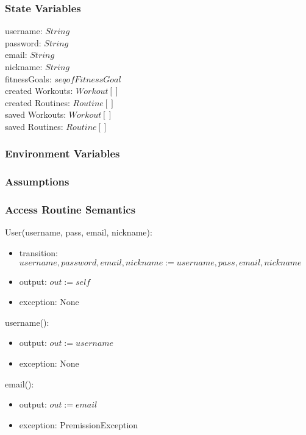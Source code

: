 \documentclass[12pt, titlepage]{article}
\begin{document}
\subsubsection{State Variables}
username: $String$ \\
password: $String$ \\
email: $String$ \\
nickname: $String$ \\
fitnessGoals: $seq of FitnessGoal$ \\
created Workouts: $Workout[]$ \\
created Routines: $Routine[]$ \\
saved Workouts: $Workout[]$ \\
saved Routines: $Routine[]$ \\

\subsubsection{Environment Variables}

\subsubsection{Assumptions}

\subsubsection{Access Routine Semantics}

User(username, pass, email, nickname):
\begin{itemize}
	\item transition: $username, password, email, nickname := username, pass, email, nickname$
	\item output: $out := self$
	\item exception: None
\end{itemize}

username():
\begin{itemize}
	\item output: $out := username$
	\item exception: None
\end{itemize}

email():
\begin{itemize}
	\item output: $out := email$
	\item exception: PremissionException
\end{itemize}
\end{document}
